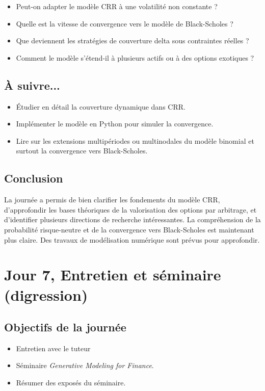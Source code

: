 \documentclass[a4paper,11pt]{article}
\begin{document}
\begin{itemize}
    \item Peut-on adapter le modèle CRR à une volatilité non constante ?
    \item Quelle est la vitesse de convergence vers le modèle de Black-Scholes ?
    \item Que deviennent les stratégies de couverture delta sous contraintes réelles ?
    \item Comment le modèle s’étend-il à plusieurs actifs ou à des options exotiques ?
\end{itemize}

\subsection{À suivre...}

\begin{itemize}
    \item Étudier en détail la couverture dynamique dans CRR.
    \item Implémenter le modèle en Python pour simuler la convergence.
    \item Lire sur les extensions multipériodes ou multinodales du modèle binomial et surtout la convergence vers Black-Scholes.
\end{itemize}

\subsection{Conclusion}

La journée a permis de bien clarifier les fondements du modèle CRR, d'approfondir les bases théoriques de la valorisation des options par arbitrage, et d'identifier plusieurs directions de recherche intéressantes. La compréhension de la probabilité risque-neutre et de la convergence vers Black-Scholes est maintenant plus claire. Des travaux de modélisation numérique sont prévus pour approfondir.
\newpage


\section{Jour 7, Entretien et séminaire (digression)}
\subsection{Objectifs de la journée}
\begin{itemize}
    \item Entretien avec le tuteur
    \item Séminaire \textit{Generative Modeling for Finance}.
    \item Résumer des exposés du séminaire.
\end{itemize}
\end{document}
